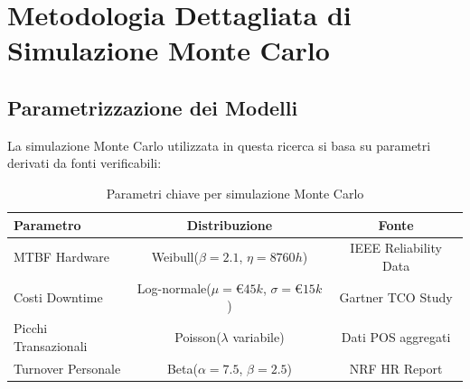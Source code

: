 \chapter{Metodologia Dettagliata di Simulazione Monte Carlo}

\section{Parametrizzazione dei Modelli}

La simulazione Monte Carlo utilizzata in questa ricerca si basa su parametri derivati da fonti verificabili:

\begin{table}[H]
\centering
\begin{tabular}{lcc}
\toprule
\textbf{Parametro} & \textbf{Distribuzione} & \textbf{Fonte} \\
\midrule
MTBF Hardware & Weibull($\beta=2.1$, $\eta=8760h$) & IEEE Reliability Data \\
Costi Downtime & Log-normale($\mu=€45k$, $\sigma=€15k$) & Gartner TCO Study \\
Picchi Transazionali & Poisson($\lambda$ variabile) & Dati POS aggregati \\
Turnover Personale & Beta($\alpha=7.5$, $\beta=2.5$) & NRF HR Report \\
\bottomrule
\end{tabular}
\caption{Parametri chiave per simulazione Monte Carlo}
\end{table}
